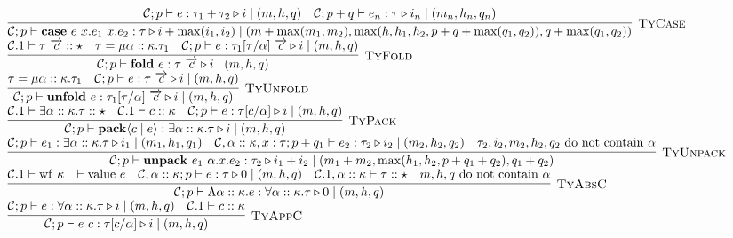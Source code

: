\documentclass[fleqn]{article}
\begin{document}
\[\begin{array}{l}
\infer[\textsc{TyCase}]{\jtygc{\mathcal{C};p }{ \mathbf{case}~e~x.e_1~x.e_2 }{ \tau }{ i + \max(i_1,i_2) }{ m + \max(m_1,m_2)}{\max(h,h_1,h_2,p+q+\max(q_1,q_2))}{q+\max(q_1,q_2)} }{\jtygc{\mathcal{C};p}{e}{ \tau_1 + \tau_2 }{ i }{ m}{h}{q} & \jtygc{\mathcal{C};p+q }{ e_n }{ \tau }{ i_n }{ m_n}{h_n}{q_n} } \\

\infer[\textsc{TyFold}]{\jtygc{\mathcal{C};p }{ \mathbf{fold}~e }{ \tau~\overrightarrow{c} }{ i }{ m}{h}{q} }{\mathcal{C}.1 \vdash \tau~\overrightarrow{c} :: \star & \tau = \mu \alpha :: \kappa. \tau_1 & \jtygc{\mathcal{C};p }{ e }{\tau_1[\tau/\alpha]~\overrightarrow{c} }{ i }{ m}{h}{q} } \\

\infer[\textsc{TyUnfold}]{\jtygc{\mathcal{C};p }{ \mathbf{unfold}~e }{ \tau_1[\tau/\alpha]~\overrightarrow{c} }{ i }{ m}{h}{q} }{\tau = \mu \alpha :: \kappa. \tau_1 & \jtygc{\mathcal{C};p }{ e }{ \tau~\overrightarrow{c} }{ i }{ m}{h}{q} } \\

\infer[\textsc{TyPack}]{\jtygc{\mathcal{C};p }{ \mathbf{pack}\langle c \mid e \rangle }{ \exists \alpha :: \kappa. \tau }{ i }{ m}{h}{q} }{\mathcal{C}.1 \vdash \exists \alpha :: \kappa. \tau :: \star & \mathcal{C}.1 \vdash c :: \kappa & \jtygc{\mathcal{C};p }{ e }{ \tau[c/\alpha] }{ i }{ m}{h}{q}} \\

\infer[\textsc{TyUnpack}]{\jtygc{\mathcal{C};p }{ \mathbf{unpack}~e_1~\alpha.x.e_2 }{ \tau_2 }{ i_1 + i_2 }{ m_1 + m_2}{\max(h_1,h_2,p+q_1+q_2)}{q_1+q_2} }{\jtygc{\mathcal{C};p }{ e_1 }{ \exists \alpha :: \kappa. \tau }{ i_1 }{ m_1}{h_1}{q_1} & \jtygc{\mathcal{C},\alpha::\kappa,x:\tau;p+q_1 }{ e_2 }{ \tau_2 }{ i_2 }{ m_2}{h_2}{q_2} & \tau_2,i_2,m_2,h_2,q_2~\mathrm{do~not~contain}~\alpha} \\

\infer[\textsc{TyAbsC}]{\jtygc{\mathcal{C};p }{ \Lambda \alpha :: \kappa. e }{\forall \alpha :: \kappa. \tau }{ 0 }{ m}{h}{q} }{\mathcal{C}.1 \vdash \mathrm{wf}~\kappa & \vdash \mathrm{value}~e & \jtygc{\mathcal{C},\alpha :: \kappa;p }{ e }{ \tau }{ 0 }{ m }{h}{q} & \mathcal{C}.1,\alpha :: \kappa \vdash \tau :: \star & m,h,q~\mathrm{do~not~contain}~\alpha} \\

\infer[\textsc{TyAppC}]{\jtygc{\mathcal{C};p }{ e~c }{\tau[c/\alpha] }{ i }{ m}{h}{q} }{\jtygc{\mathcal{C};p }{ e }{\forall \alpha :: \kappa. \tau }{ i }{ m}{h}{q} & \mathcal{C}.1 \vdash c :: \kappa} \\


\end{array}\]
\end{document}
